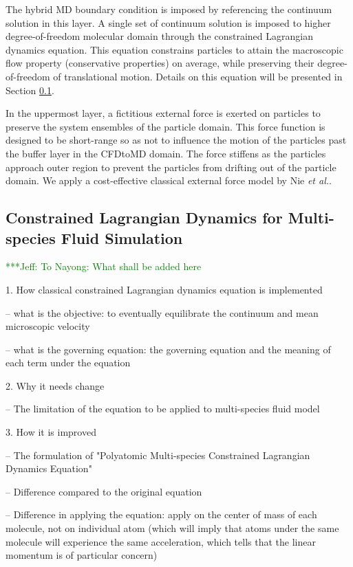 \documentclass[]{aiaa-tc}%
\newcommand{\skonote}[1]{ {\textcolor{green} { ***Jeff: #1 }}}
\begin{document}
The hybrid MD boundary condition is imposed by referencing the continuum solution
in this layer. A single set of continuum solution is imposed to higher
degree-of-freedom molecular domain through the constrained Lagrangian dynamics
equation. This equation constrains particles to attain the macroscopic flow property 
(conservative properties) on average, while preserving their degree-of-freedom of 
translational motion. Details on this equation will be presented in Section
\ref{sec:hybrid_multispecies}.

In the uppermost layer, a fictitious external force is exerted on particles 
to preserve the system ensembles of the particle domain. This force function
is designed to be short-range so as not to influence the motion of the particles 
past the buffer layer in the CFDtoMD domain. The force stiffens as the particles 
approach outer region to prevent the particles from drifting out of the 
particle domain. We apply a cost-effective classical external force model 
by Nie {\it{et al.}}\cite{Nie}. 


\subsection{Constrained Lagrangian Dynamics for Multi-species Fluid Simulation}
\label{sec:hybrid_multispecies}

\skonote{To Nayong: What shall be added here}

1. How classical constrained Lagrangian dynamics equation is implemented

-- what is the objective: to eventually equilibrate the continuum and mean microscopic velocity

-- what is the governing equation: the governing equation and the meaning of each term under the equation

2. Why it needs change

-- The limitation of the equation to be applied to multi-species fluid model

3. How it is improved

-- The formulation of "Polyatomic Multi-species Constrained Lagrangian Dynamics Equation"

-- Difference compared to the original equation

-- Difference in applying the equation: apply on the center of mass of each molecule, not on individual atom (which will imply that atoms under the same molecule will experience the same acceleration, which tells that the linear momentum is of particular concern)
\end{document}
